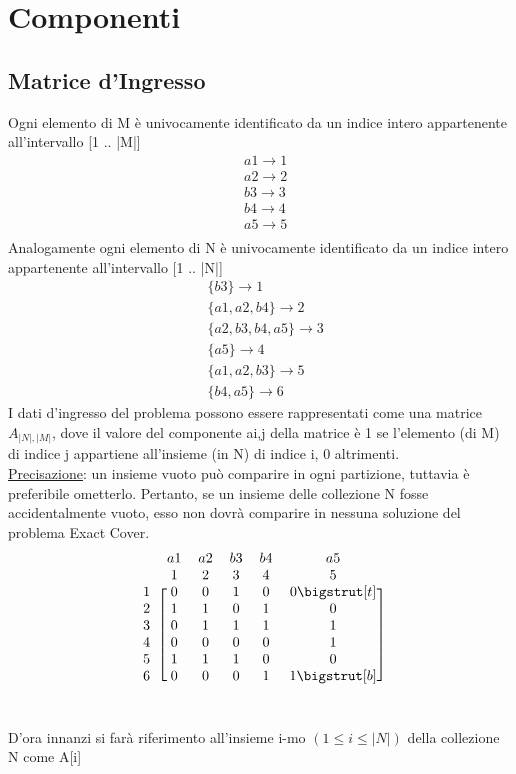 \section{Componenti}

\subsection{Matrice d'Ingresso}
Ogni elemento di M è univocamente identificato da un indice intero appartenente all’intervallo [1 .. |M|]
\begin{align*}
 & a1 \rightarrow 1 \\
 & a2 \rightarrow 2 \\
 & b3 \rightarrow 3 \\
 & b4 \rightarrow 4 \\
 & a5 \rightarrow 5 \\
\end{align*}
Analogamente ogni elemento di N è univocamente identificato da un indice intero appartenente all’intervallo [1 .. |N|]
\begin{align*}
     & \{b3\} \rightarrow 1 \\
     & \{a1,a2,b4\} \rightarrow 2 \\ 
     & \{a2,b3,b4,a5\} \rightarrow 3 \\ 
     & \{a5\}  \rightarrow 4 \\
     & \{a1,a2,b3\} \rightarrow 5 \\
     & \{b4,a5\} \rightarrow 6 
\end{align*}
I dati d’ingresso del problema possono essere rappresentati come una matrice $A_{|N|,|M|}$, dove il valore del componente ai,j della matrice è 1 se l’elemento (di M) di indice j appartiene all’insieme (in N) di indice i, 0 altrimenti.\\
\underline{Precisazione}: un insieme vuoto può comparire in ogni partizione, tuttavia è preferibile ometterlo. Pertanto, se un insieme delle collezione N fosse accidentalmente vuoto, esso non dovrà comparire in nessuna soluzione del problema Exact Cover.
\[
\begin{blockarray}{cccccc}
     & a1 & a2 & b3 & b4 & a5 \\
     & 1 & 2 & 3 & 4 & 5 \\
    \begin{block}{c[ccccc]}
        1 & 0 & 0 & 1 & 0 & 0\bigstrut[t] \\
        2 & 1 & 1 & 0 & 1 & 0 \\
        3 & 0 & 1 & 1 & 1 & 1 \\
        4 & 0 & 0 & 0 & 0 & 1 \\
        5 & 1 & 1 & 1 & 0 & 0 \\
        6 & 0 & 0 & 0 & 1 & 1\bigstrut[b]\\
    \end{block}
\end{blockarray}\vspace*{-1.25\baselineskip}
\]
\\
D’ora innanzi si farà riferimento all’insieme i-mo $(1 \leq i \leq |N|)$ della collezione N come A[i]

